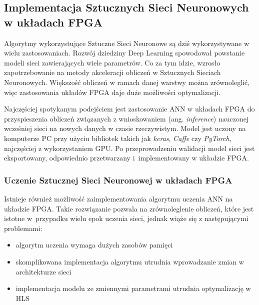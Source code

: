 \subsection{Implementacja Sztucznych Sieci Neuronowych w układach FPGA}

Algorytmy wykorzystujące Sztuczne Sieci Neuronowe są dziś wykorzystywane w wielu zastosowaniach. Rozwój dziedziny Deep 
Learning spowodował powstanie modeli sieci zawierających wiele parametrów. Co za tym idzie, wzrosło zapotrzebowanie na metody 
akceleracji obliczeń w Sztucznych Sieciach Neuronowych. Większość obliczeń w ramach danej warstwy można zrównoleglić, więc 
zastosowania układów FPGA daje duże możliwości optymalizacji.

Najczęściej spotykanym podejściem jest zastosowanie ANN w układach FPGA do przyspieszenia obliczeń związanych z wnioskowaniem (ang. \emph{inference}) nauczonej 
wcześniej sieci na nowych danych w czasie rzeczywistym. Model jest uczony na komputerze PC przy użyciu bibliotek takich jak 
\emph{keras}, \emph{Caffe} czy \emph{PyTorch}, najczęściej z wykorzystaniem GPU. Po przeprowadzeniu walidacji model sieci jest eksportowany, odpowiednio przetwarzany i~implementowany w układzie FPGA. 



\subsubsection{Uczenie Sztucznej Sieci Neuronowej w układach FPGA}

Istnieje również możliwość zaimplementowania algorytmu uczenia ANN na układzie FPGA. Takie rozwiązanie pozwala na zrównoleglenie obliczeń, które jest istotne w~przypadku wielu epok uczenia sieci, jednak wiąże się z następującymi problemami:
\begin{itemize}
    \item algorytm uczenia wymaga dużych zasobów pamięci
    \item skomplikowana implementacja algorytmu utrudnia wprowadzanie zmian w architekturze sieci
    \item implementacja modelu ze zmiennymi parametrami utrudnia optymalizację w HLS
\end{itemize}



